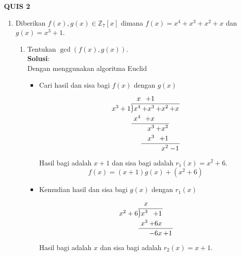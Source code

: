 \documentclass{article}
\newcommand{\longdiv}{\smash{\mkern-0.43mu\vstretch{1.31}{\hstretch{.7}{)}}\mkern-5.2mu\vstretch{1.31}{\hstretch{.7}{)}}}}
\newcommand{\Z}{\mathbb{Z}}
\newcommand{\jawab}{\textbf{Solusi}:}
\begin{document}
\begin{center}
    \textbf{QUIS 2}
\end{center}
\begin{enumerate}
    \item Diberikan $f(x),g(x)\in \Z_7[x]$ dimana $f(x)=x^4+x^3+x^2+x$ dan $g(x)=x^3+1$.
    \begin{enumerate}
        \item Tentukan $\gcd(f(x),g(x))$.\\
        \jawab\\
        Dengan menggunakan algoritma Euclid
        \begin{itemize}
            \item Cari hasil dan sisa bagi $f(x)$ dengan $g(x)$
            \[
        \arraycolsep=1pt
        \renewcommand\arraystretch{1.2}
        \begin{array}{*1r @{\hskip\arraycolsep}c@{\hskip\arraycolsep} *{11}r}
            & &x&+1&\\
        \cline{2-6}
        x^3+1 & \longdiv & x^4 & + x^3 &+ x^2 & +x  \\
            &  & x^4 &+ x \\
        \cline{2-5}
            &  & &x^3 &+ x^2  \\
            &  & &x^3 &+1\\
        \cline{4-6}
            &  & & &x^2 &- 1\\
        \end{array}\]
        Hasil bagi adalah $x+1$ dan sisa bagi adalah $r_1(x)=x^2+6$.
        \begin{equation}\label{1}
            f(x)=(x+1)g(x)+(x^2+6)
        \end{equation}
            \item Kemudian hasil dan sisa bagi $g(x)$ dengan $r_1(x)$
            \[
        \arraycolsep=1pt
        \renewcommand\arraystretch{1.2}
        \begin{array}{*1r @{\hskip\arraycolsep}c@{\hskip\arraycolsep} *{11}r}
            & &x&\\
        \cline{2-4}
        x^2+6 & \longdiv & x^3 & + 1  \\
            &  & x^3 &+ 6x \\
        \cline{2-5}
            &  & &-6x & +1  \\
        \end{array}\]
        Hasil bagi adalah $x$ dan sisa bagi adalah $r_2(x)=x+1$.
        \begin{equation}\label{2}

\end{equation}
\end{itemize}
\end{enumerate}
\end{enumerate}
\end{document}
